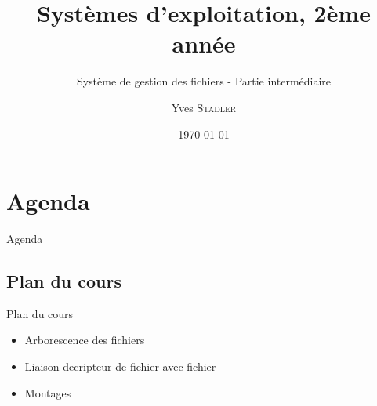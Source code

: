 
\title{Systèmes d'exploitation, 2ème année}
\subtitle{Système de gestion des fichiers - Partie intermédiaire}

\author{Yves \textsc{Stadler}}

\date{\today}




\begin{frame}
\titlepage
\end{frame}

\def\sectitle{Agenda}
\section{\sectitle}

\begin{frame}{\sectitle}
\def\subsectitle{Plan du cours}
\subsection{\subsectitle}
\begin{block}{\subsectitle}
\begin{itemize}
    \item Arborescence des fichiers
    \item Liaison decripteur de fichier avec fichier
    \item Montages
\end{itemize}
\end{block}
\end{frame}

\def\sectitle{Liaison avec la partie symbolique}
